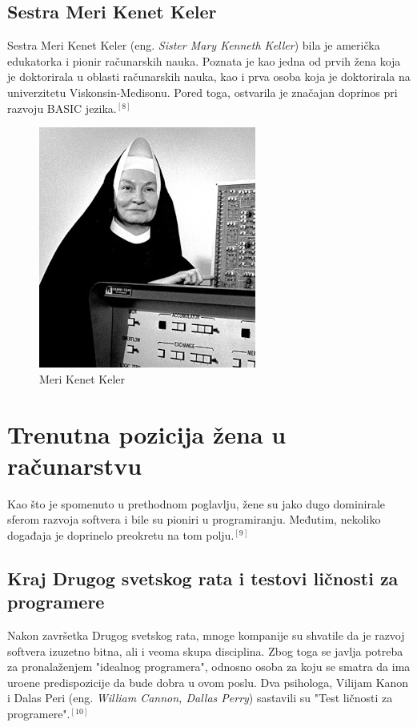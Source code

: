 \documentclass[12pt]{article}
\begin{document}
\subsection{Sestra Meri Kenet Keler}

Sestra Meri Kenet Keler (eng. \textit{Sister Mary Kenneth Keller}) bila je američka edukatorka i pionir računarskih nauka. Poznata je kao jedna od prvih žena koja je doktorirala u oblasti računarskih nauka, kao i prva osoba koja je doktorirala na univerzitetu Viskonsin-Medisonu.
Pored toga, ostvarila je značajan doprinos pri razvoju BASIC jezika.$^{[8]}$

\begin{figure}[htp]
    \centering
    \includegraphics[width=0.6\linewidth]{marykenneth.png}
    \caption{Meri Kenet Keler}
\end{figure}

\newpage

\section{Trenutna pozicija žena u računarstvu}

Kao što je spomenuto u prethodnom poglavlju, žene su jako dugo dominirale sferom razvoja softvera i bile su pioniri u programiranju. Međutim, nekoliko događaja je doprinelo preokretu na tom polju.$^{[9]}$

\subsection{Kraj Drugog svetskog rata i testovi ličnosti za programere}

Nakon završetka Drugog svetskog rata, mnoge kompanije su shvatile da je razvoj softvera izuzetno bitna, ali i veoma skupa disciplina. Zbog toga se javlja potreba za pronalaženjem "idealnog programera", odnosno osoba za koju se smatra da ima uro\dj ene predispozicije da bude dobra u ovom poslu. Dva psihologa, Vilijam Kanon i Dalas Peri (eng. \textit{William Cannon, Dallas Perry}) sastavili su "Test ličnosti za programere".$^{[10]}$ 
\end{document}
